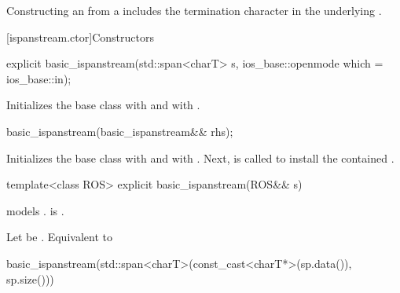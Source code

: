 \pnum
\begin{note}
Constructing an  from a 
includes the termination character 
in the underlying .
\end{note}

[ispanstream.ctor]{Constructors}

%
\begin{itemdecl}
explicit basic_ispanstream(std::span<charT> s, ios_base::openmode which = ios_base::in);
\end{itemdecl}

\begin{itemdescr}
\pnum
\effects
Initializes the base class with
and  with
.
\end{itemdescr}

%
\begin{itemdecl}
basic_ispanstream(basic_ispanstream&& rhs);
\end{itemdecl}

\begin{itemdescr}
\pnum
\effects
Initializes the base class with 
and  with .
Next,  is called
to install the contained .
\end{itemdescr}

%
\begin{itemdecl}
template<class ROS> explicit basic_ispanstream(ROS&& s)
\end{itemdecl}

\begin{itemdescr}
\pnum
\constraints
{} models .
is .

\pnum
\effects
Let  be .
Equivalent to
\begin{codeblock}
basic_ispanstream(std::span<charT>(const_cast<charT*>(sp.data()), sp.size()))
\end{codeblock}
\end{itemdescr}

